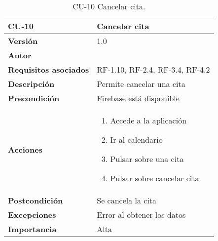 \begin{table}[p]
	\centering
	\begin{tabularx}{\linewidth}{ p{} p{} }
		\toprule
		\textbf{CU-10}    & \textbf{Cancelar cita}\\
		\toprule
		\textbf{Versión}              & 1.0    \\
		\textbf{Autor}                & {\nombre} \\
		\textbf{Requisitos asociados} & RF-1.10, RF-2.4, RF-3.4, RF-4.2 \\
		\textbf{Descripción}          & Permite cancelar una cita\\
		\textbf{Precondición}         & Firebase está disponible \\
		\textbf{Acciones}             &
		\begin{enumerate}
			\def\labelenumi{\arabic{enumi}.}
			\tightlist
			\item Accede a la aplicación
			\item Ir al calendario
			\item Pulsar sobre una cita
			\item Pulsar sobre cancelar cita
		\end{enumerate}\\
		\textbf{Postcondición}        & Se cancela la cita \\
		\textbf{Excepciones}          & Error al obtener los datos \\
		\textbf{Importancia}          & Alta \\
		\bottomrule
	\end{tabularx}
	\caption{CU-10 Cancelar cita.}
\end{table}


